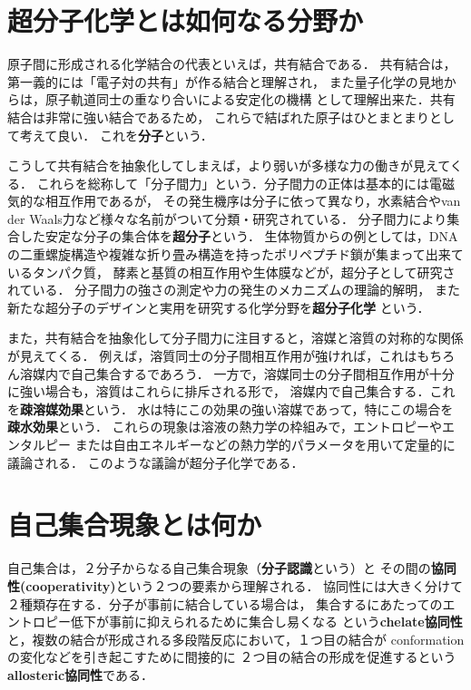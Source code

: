 \documentclass[uplatex,dvipdfmx]{jsarticle}
\begin{document}
\section{超分子化学とは如何なる分野か}

原子間に形成される化学結合の代表といえば，共有結合である．
共有結合は，第一義的には「電子対の共有」が作る結合と理解され，
また量子化学の見地からは，原子軌道同士の重なり合いによる安定化の機構
として理解出来た．共有結合は非常に強い結合であるため，
これらで結ばれた原子はひとまとまりとして考えて良い．
これを\textbf{分子}という．

こうして共有結合を抽象化してしまえば，より弱いが多様な力の働きが見えてくる．
これらを総称して「分子間力」という．分子間力の正体は基本的には電磁気的な相互作用であるが，
その発生機序は分子に依って異なり，水素結合やvan der Waals力など様々な名前がついて分類・研究されている．
分子間力により集合した安定な分子の集合体を\textbf{超分子}という．
生体物質からの例としては，DNAの二重螺旋構造や複雑な折り畳み構造を持ったポリペプチド鎖が集まって出来ているタンパク質，
酵素と基質の相互作用や生体膜などが，超分子として研究されている．
分子間力の強さの測定や力の発生のメカニズムの理論的解明，
また新たな超分子のデザインと実用を研究する化学分野を\textbf{超分子化学}
という．

また，共有結合を抽象化して分子間力に注目すると，溶媒と溶質の対称的な関係が見えてくる．
例えば，溶質同士の分子間相互作用が強ければ，これはもちろん溶媒内で自己集合するであろう．
一方で，溶媒同士の分子間相互作用が十分に強い場合も，溶質はこれらに排斥される形で，
溶媒内で自己集合する．これを\textbf{疎溶媒効果}という．
水は特にこの効果の強い溶媒であって，特にこの場合を\textbf{疎水効果}という．
これらの現象は溶液の熱力学の枠組みで，エントロピーやエンタルピー
または自由エネルギーなどの熱力学的パラメータを用いて定量的に議論される．
このような議論が超分子化学である．

\section{自己集合現象とは何か}

自己集合は，２分子からなる自己集合現象（\textbf{分子認識}という）と
その間の\textbf{協同性(cooperativity)}という２つの要素から理解される．
協同性には大きく分けて２種類存在する．分子が事前に結合している場合は，
集合するにあたってのエントロピー低下が事前に抑えられるために集合し易くなる
という\textbf{chelate協同性}と，複数の結合が形成される多段階反応において，１つ目の結合が
conformationの変化などを引き起こすために間接的に
２つ目の結合の形成を促進するという\textbf{allosteric協同性}である．
\end{document}
